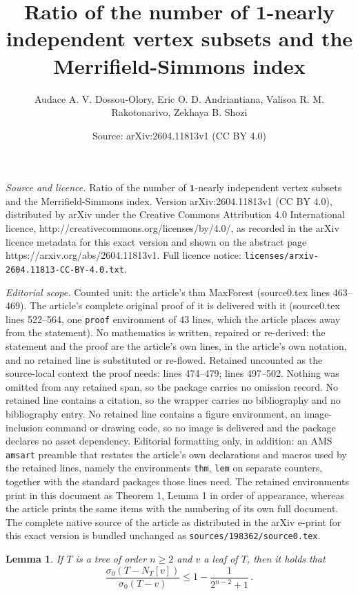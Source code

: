 \documentclass[10pt,a4paper]{amsart}
\title{Ratio of the number of $\mathbf{1}$-nearly independent vertex subsets and the Merrifield-Simmons index}
\author{Audace A. V. Dossou-Olory, Eric O. D. Andriantiana, Valisoa R. M. Rakotonarivo, Zekhaya B. Shozi}
\date{Source: arXiv:2604.11813v1 (CC BY 4.0)}
\newtheorem{lem}{Lemma}
\begin{document}
\maketitle

\noindent\emph{Source and licence.} Ratio of the number of $\mathbf{1}$-nearly independent vertex subsets and the Merrifield-Simmons index. Version arXiv:2604.11813v1 (CC BY 4.0), distributed by arXiv under the Creative Commons Attribution 4.0 International licence, http://creativecommons.org/licenses/by/4.0/, as recorded in the arXiv licence metadata for this exact version and shown on the abstract page https://arxiv.org/abs/2604.11813v1. Full licence notice: \texttt{licenses/arxiv-2604.11813-CC-BY-4.0.txt}.\par\smallskip

\noindent\textit{Editorial scope.} Counted unit: the article's thm MaxForest (source0.tex lines 463--469). The article's complete original proof of it is delivered with it (source0.tex lines 522--564, one \texttt{proof} environment of 43 lines, which the article places away from the statement). No mathematics is written, repaired or re-derived: the statement and the proof are the article's own lines, in the article's own notation, and no retained line is substituted or re-flowed.  Retained uncounted as the source-local context the proof needs: lines 474--479; lines 497--502.  Nothing was omitted from any retained span, so the package carries no omission record.  No retained line contains a citation, so the wrapper carries no bibliography and no bibliography entry.  No retained line contains a figure environment, an image-inclusion command or drawing code, so no image is delivered and the package declares no asset dependency.  Editorial formatting only, in addition: an AMS \texttt{amsart} preamble that restates the article's own declarations and macros used by the retained lines, namely the environments \texttt{thm}, \texttt{lem} on separate counters, together with the standard packages those lines need.  The retained environments print in this document as Theorem 1, Lemma 1 in order of appearance, whereas the article prints the same items with the numbering of its own full document.  The complete native source of the article as distributed in the arXiv e-print for this exact version is bundled unchanged as \texttt{sources/198362/source0.tex}.
	\begin{lem}\label{Lem:1}
		If $T$ is a tree of order $n\geq 2$  and $v$ a leaf of $T$, then it holds that
		\begin{equation*}
			\frac{\sigma_0\left(T-N_T[v]\right)}{\sigma_0\left(T-v\right)}\leq 1-\frac{1}{2^{n-2}+1}\,.
		\end{equation*}
	\end{lem}
\end{document}

